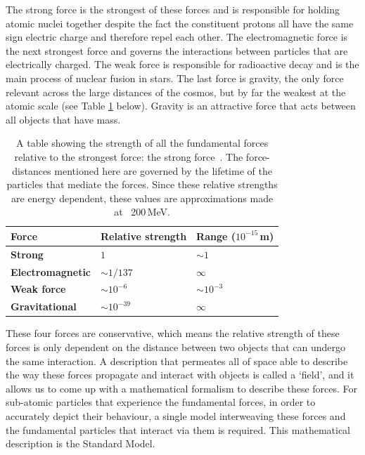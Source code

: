 The strong force is the strongest of these forces and is responsible for holding atomic nuclei together despite the fact the constituent protons all have the same sign electric charge and therefore repel each other. The electromagnetic force is the next strongest force and governs the interactions between particles that are electrically charged. The weak force is responsible for radioactive decay and is the main process of nuclear fusion in stars. The last force is gravity, the only force relevant across the large distances of the cosmos, but by far the weakest at the atomic scale (see Table \ref{tab:relForceStr} below). Gravity is an attractive force that acts between all objects that have mass.\\

\begin{table}[h!]
\centering
\caption[Table showing the strength of all the fundamental forces relative to the strongest force; the strong force.]{A table showing the strength of all the fundamental forces relative to the strongest force: the strong force~\cite{Forces}. The force-distances mentioned here are governed by the lifetime of the particles that mediate the forces. Since these relative strengths are energy dependent, these values are approximations made at ~200\,MeV.}
\label{tab:relForceStr}
\begin{tabular}{|l|l|l|}
\hline
\textbf{Force} & \textbf{Relative strength} & \textbf{Range ($10^{-15}$\,m)} \\ \hline
\textbf{Strong} & $1$ & $\sim 1$ \\ \hline
\textbf{Electromagnetic} & $\sim 1/137$ & $\infty$ \\ \hline
\textbf{Weak force} & $\sim 10^{-6}$ & $\sim 10^{-3}$~\cite{Zboson}\\ \hline
\textbf{Gravitational} & $\sim 10^{-39}$ & $\infty$ \\ \hline
\end{tabular}
\end{table}

These four forces are conservative, which means the relative strength of these forces is only dependent on the distance between two objects that can undergo the same interaction. A description that permeates all of space able to describe the way these forces propagate and interact with objects is called a `field', and it allows us to come up with a mathematical formalism to describe these forces. For sub-atomic particles that experience the fundamental forces, in order to accurately depict their behaviour, a single model interweaving these forces and the fundamental particles that interact via them is required. This mathematical description is the Standard Model.
 
